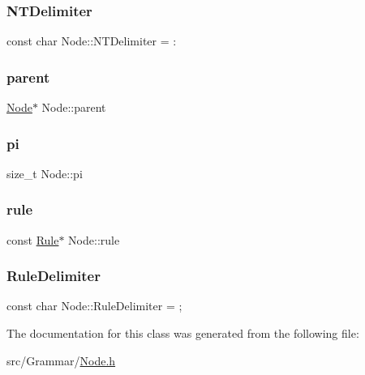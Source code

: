 \mbox{\label{class_node_abd26102ffbe2a3e00c34bed5508b3234}} 
\subsubsection{\texorpdfstring{N\+T\+Delimiter}{NTDelimiter}}
{\footnotesize\ttfamily const char Node\+::\+N\+T\+Delimiter = \textquotesingle{}\+:\textquotesingle{}\hspace{0.3cm}{\ttfamily [static]}}

\mbox{\label{class_node_ad8184598cdea70e4bbdfd76f2b0f9e85}} 
\subsubsection{\texorpdfstring{parent}{parent}}
{\footnotesize\ttfamily \hyperlink{class_node}{Node}$\ast$ Node\+::parent}

\mbox{\label{class_node_ad8e140a5af4e5c312141f2b7af255520}} 
\subsubsection{\texorpdfstring{pi}{pi}}
{\footnotesize\ttfamily size\+\_\+t Node\+::pi}

\mbox{\label{class_node_a02f5c9463cceb270ad5730760f19c722}} 
\subsubsection{\texorpdfstring{rule}{rule}}
{\footnotesize\ttfamily const \hyperlink{class_rule}{Rule}$\ast$ Node\+::rule}

\mbox{\label{class_node_ab58932e82964fb75ba806870c4069dc2}} 
\subsubsection{\texorpdfstring{Rule\+Delimiter}{RuleDelimiter}}
{\footnotesize\ttfamily const char Node\+::\+Rule\+Delimiter = \textquotesingle{};\textquotesingle{}\hspace{0.3cm}{\ttfamily [static]}}



The documentation for this class was generated from the following file\+:\begin{DoxyCompactItemize}
\item 
src/\+Grammar/\hyperlink{_node_8h}{Node.\+h}\end{DoxyCompactItemize}
